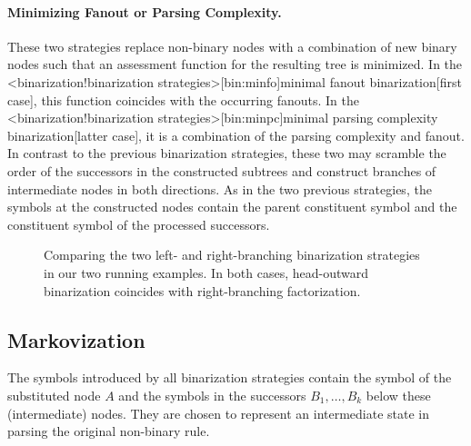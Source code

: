 \documentclass[../../document.tex]{subfiles}
\begin{document}
    \paragraph{Minimizing Fanout or Parsing Complexity.}
    These two strategies replace non-binary nodes with a combination of new binary nodes such that an assessment function for the resulting tree is minimized.
    In the <binarization!binarization strategies>[bin:minfo]{minimal fanout binarization}[first case], this function coincides with the occurring fanouts.
    In the <binarization!binarization strategies>[bin:minpc]{minimal parsing complexity binarization}[latter case], it is a combination of the parsing complexity and fanout.
    In contrast to the previous binarization strategies, these two may scramble the order of the successors in the constructed subtrees and construct branches of intermediate nodes in both directions.
    As in the two previous strategies, the symbols at the constructed nodes contain the parent constituent symbol and the constituent symbol of the processed successors.

    \begin{figure}
        \resizebox{.3\linewidth}{!}{}\hfill
        \resizebox{.3\linewidth}{!}{}\hfill
        \resizebox{.3\linewidth}{!}{}

        \vspace{.5cm}

        \resizebox{.3\linewidth}{!}{}\hfill
        \resizebox{.3\linewidth}{!}{}\hfill
        \resizebox{.3\linewidth}{!}{}

        \caption{\label{fig:ex:binarization}
            Comparing the two left- and right-branching binarization strategies in our two running examples.
            In both cases, head-outward binarization coincides with right-branching factorization.
        }
    \end{figure}


    \subsection{Markovization}
    The symbols introduced by all binarization strategies contain the symbol of the substituted node \(A\) and the symbols in the successors \(B_1, \ldots, B_k\) below these (intermediate) nodes.
    They are chosen to represent an intermediate state in parsing the original non-binary rule.
\end{document}
